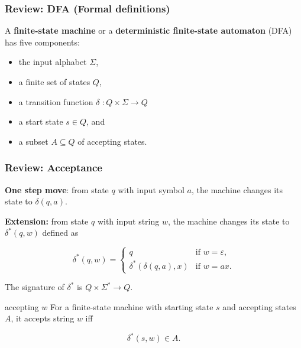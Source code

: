 

\newcommand\sbullet[1][.5]{\mathbin{\vcenter{\hbox{\scalebox{#1}{$\bullet$}}}}}

\renewcommand{\epsilon}{\varepsilon}

\newcommand{\czero}{{\mathtt 0}}
\newcommand{\cone}{{\mathtt 1}}

\begin{frame}
  \frametitle{Review: DFA (Formal definitions)}

  A {\color{red}\bf finite-state machine} or a {\color{red}\bf
    deterministic finite-state automaton} (DFA) has five components:

  \begin{itemize}
  \item the input alphabet $\Sigma$,
  \item a finite set of states $Q$,
  \item a transition function $\delta$ $:Q\times\Sigma \longrightarrow Q$
  \item a start state $s\in Q$, and
  \item a subset $A\subseteq Q$ of accepting states.
  \end{itemize}
  
\end{frame}

\begin{frame}
  \frametitle{Review: Acceptance}

  {\bf One step move}: from state $q$ with input symbol $a$, the
  machine changes its state to $\delta(q,a)$.

  {\bf Extension:} from state $q$ with input string $w$, the machine
  changes its state to $\delta^*(q,w)$ defined as

  \begin{block}{}
  \[
  \delta^*(q,w) = \left\{
  \begin{array}{ll}
    q & \mbox{if $w=\epsilon$,} \\
    \delta^*(\delta(q,a),x) & \mbox{if $w=ax$.}
  \end{array}
  \right.
  \]
  \end{block}
  
  The signature of $\delta^*$ is $Q\times\Sigma^* \longrightarrow Q$.

  \begin{block}{accepting $w$}   
    For a finite-state machine with starting state $s$ and accepting
    states $A$, it accepts string $w$ iff
    
    \[
    \delta^*(s,w)\in A.
    \]
  \end{block}
\end{frame}

